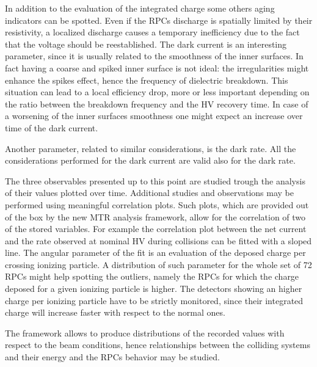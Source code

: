 In addition to the evaluation of the integrated charge some others aging indicators can be spotted.
Even if the RPCs discharge is spatially limited by their resistivity, a localized discharge causes a temporary inefficiency due to the fact that the voltage should be reestablished.
The dark current is an interesting parameter, since it is usually related to the smoothness of the inner surfaces.
In fact having a coarse and spiked inner surface is not ideal: the irregularities might enhance the spikes effect, hence the frequency of dielectric breakdown.
This situation can lead to a local efficiency drop, more or less important depending on the ratio between the breakdown frequency and the HV recovery time.
In case of a worsening of the inner surfaces smoothness one might expect an increase over time of the dark current.

Another parameter, related to similar considerations, is the dark rate.
All the considerations performed for the dark current are valid also for the dark rate.

The three observables presented up to this point are studied trough the analysis of their values plotted over time.
Additional studies and observations may be performed using meaningful correlation plots.
Such plots, which are provided out of the box by the new MTR analysis framework, allow for the correlation of two of the stored variables.
For example the correlation plot between the net current and the rate observed at nominal HV during collisions can be fitted with a sloped line.
The angular parameter of the fit is an evaluation of the deposed charge per crossing ionizing particle.
A distribution of such parameter for the whole set of 72 RPCs might help spotting the outliers, namely the RPCs for which the charge deposed for a given ionizing particle is higher.
The detectors showing an higher charge per ionizing particle have to be strictly monitored, since their integrated charge will increase faster with respect to the normal ones.

The framework allows to produce distributions of the recorded values with respect to the beam conditions, hence relationships between the colliding systems and their energy and the RPCs behavior may be studied.


